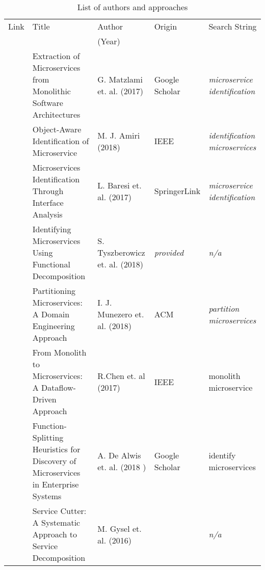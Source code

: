 \begin{flushleft}

\begin{table}[h!]

\centering
     
	
	 \flushleft
	\begin{tabularx}{\textwidth}{lXXlX}
		\rowcolor{gray!50}
		Link & Title & Author   & Origin & Search String  \\
		
		\rowcolor{gray!50}
		& & (Year) & & \\
		
		\cite{ExtractionMazlami} & Extraction of Microservices from Monolithic Software Architectures  & G. Matzlami et. al. (2017) & Google Scholar&  {\itshape microservice identification }  \\
		
		
		\cite{ObjectAwareAmiri} & Object-Aware Identification of Microservice & M. J. Amiri (2018) & IEEE & \textit{identification microservices}\\\
		
		\cite{interfaceAnalysisBaresi} & Microservices Identification Through Interface Analysis & L. Baresi et. al. (2017)& SpringerLink & \textit{microservice identification}\\
		
		
		
		 
		 \cite{FunctionalDecompositionHeinrich}& Identifying Microservices Using Functional Decomposition & S. Tyszberowicz et. al. (2018) & \textit{provided} & \textit{n/a} \\
		 
		 \cite{DomainEngineeringMunezero} & Partitioning Microservices: A Domain Engineering Approach & I. J. Munezero et. al. (2018) & ACM & \textit{partition microservices}\\
		 
		 
		 \cite{DataflowDrivenChen} & From Monolith to Microservices: A Dataflow-Driven Approach & R.Chen et. al (2017)& IEEE & monolith microservice \\
		 
		\cite{HeuristicsAlwis} & Function-Splitting Heuristics for Discovery of Microservices in Enterprise Systems & A. De Alwis et. al. (2018 )& Google Scholar & identify microservices \\
		
	\cite{ServiceCutter} & 	Service Cutter: A Systematic Approach to Service Decomposition& M. Gysel et. al. (2016) & \cite{interfaceAnalysisBaresi} & \textit{n/a} \\
	
	\end{tabularx}
	\caption{List of authors and approaches}
	\label{tab:overviewLiterature}
\end{table}

\end{flushleft}

